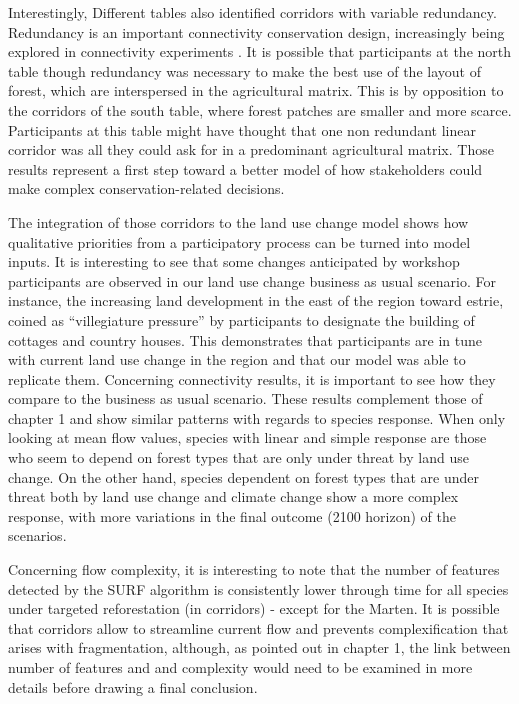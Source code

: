 {Interestingly, Different tables also identified corridors with variable redundancy. Redundancy is an important connectivity conservation design, increasingly being explored in connectivity experiments \citep{fletcher_matrix_2014}. It is possible that participants at the north table though redundancy was necessary to make the best use of the layout of forest, which are interspersed in the agricultural matrix. This is by opposition to the corridors of the south table, where forest patches are smaller and more scarce. Participants at this table might have thought that one non redundant linear corridor was all they could ask for in a predominant agricultural matrix. Those results represent a first step toward a better model of how stakeholders could make complex conservation-related decisions. 

The integration of those corridors to the land use change model shows how qualitative priorities from a participatory process can be turned into model inputs. It is interesting to see that some changes anticipated by workshop participants are observed in our land use change business as usual scenario. For instance, the increasing land development in the east of the region toward estrie, coined as “villegiature pressure” by participants to designate the building of cottages and country houses. This demonstrates that participants are in tune with current land use change in the region and that our model was able to replicate them. Concerning connectivity results, it is important to see how they compare to the business as usual scenario. These results complement those of chapter 1 and show similar patterns with regards to species response. When only looking at mean flow values, species with linear and simple response are those who seem to depend on forest types that are only under threat by land use change. On the other hand, species dependent on forest types that are under threat both by land use change and climate change show a more complex response, with more variations in the final outcome (2100 horizon) of the scenarios. 

Concerning flow complexity, it is interesting to note that the number of features detected by the SURF algorithm is consistently lower through time for all species under targeted reforestation (in corridors) - except for the Marten. It is possible that corridors allow to streamline current flow and prevents complexification that arises with fragmentation, although, as pointed out in chapter 1, the link between number of features and and complexity would need to be examined in more details before drawing a final conclusion. 

}
